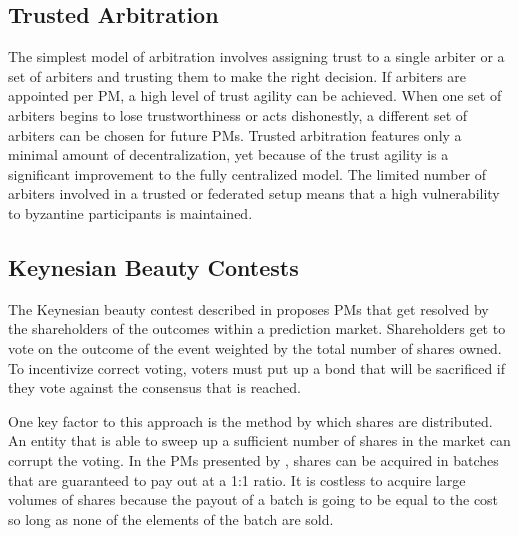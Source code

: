 \documentclass[onecolumn]{article}
\begin{document}
\subsection{Trusted Arbitration}
The simplest model of arbitration involves assigning trust to a single arbiter or a set of arbiters and trusting them to make the right decision.
If arbiters are appointed per PM, a high level of trust agility can be achieved.
When one set of arbiters begins to lose trustworthiness or acts dishonestly, a different set of arbiters can be chosen for future PMs.
Trusted arbitration features only a minimal amount of decentralization, yet because of the trust agility is a significant improvement to the fully centralized model.
The limited number of arbiters involved in a trusted or federated setup means that a high vulnerability to byzantine participants is maintained.


\subsection{Keynesian Beauty Contests}
The Keynesian beauty contest described in \cite{pmob} proposes PMs that get resolved by the shareholders of the outcomes within a prediction market.
Shareholders get to vote on the outcome of the event weighted by the total number of shares owned.
To incentivize correct voting, voters must put up a bond that will be sacrificed if they vote against the consensus that is reached.

One key factor to this approach is the method by which shares are distributed.
An entity that is able to sweep up a sufficient number of shares in the market can corrupt the voting.
In the PMs presented by \cite{pmob}, shares can be acquired in batches that are guaranteed to pay out at a 1:1 ratio.
It is costless to acquire large volumes of shares because the payout of a batch is going to be equal to the cost so long as none of the elements of the batch are sold.
\end{document}
